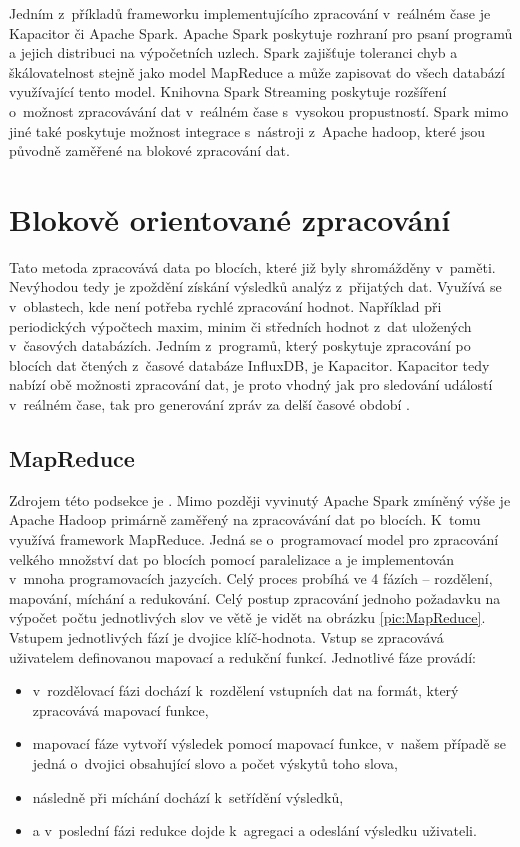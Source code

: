 Jedním z~příkladů frameworku implementujícího zpracování v~reálném čase je Kapacitor či Apache Spark. Apache Spark poskytuje rozhraní pro psaní programů a jejich distribuci na výpočetních uzlech. Spark zajišťuje toleranci chyb a škálovatelnost stejně jako model MapReduce a může zapisovat do všech databází využívající tento model. Knihovna Spark Streaming poskytuje rozšíření o~možnost zpracovávání dat v~reálném čase s~vysokou propustností. Spark mimo jiné také poskytuje možnost integrace s~nástroji z~Apache hadoop, které jsou původně zaměřené na blokové zpracování dat. 

\section{Blokově orientované zpracování}
Tato metoda zpracovává data po blocích, které již byly shromážděny v~paměti. Nevýhodou tedy je zpoždění získání výsledků analýz z~přijatých dat. Využívá se v~oblastech, kde není potřeba rychlé zpracování hodnot. Například při periodických výpočtech maxim, minim či středních hodnot z~dat uložených v~časových databázích. Jedním z~programů, který poskytuje zpracování po blocích dat čtených z~časové databáze InfluxDB, je Kapacitor. Kapacitor tedy nabízí obě možnosti zpracování dat, je proto vhodný jak pro sledování událostí v~reálném čase, tak pro generování zpráv za delší časové období \cite{batchProcessing}.

\subsection*{MapReduce}
Zdrojem této podsekce je \cite{MapReduce}. Mimo později vyvinutý Apache Spark zmíněný výše je Apache Hadoop primárně zaměřený na zpracovávání dat po blocích. K~tomu využívá framework MapReduce. Jedná se o~programovací model pro zpracování velkého množství dat po blocích pomocí paralelizace a je implementován v~mnoha programovacích jazycích. Celý proces probíhá ve 4 fázích -- rozdělení, mapování, míchání a redukování. Celý postup zpracování jednoho požadavku na výpočet počtu jednotlivých slov ve větě je vidět na obrázku \ref{pic:MapReduce}. Vstupem jednotlivých fází je dvojice klíč-hodnota. Vstup se zpracovává uživatelem definovanou mapovací a redukční funkcí. Jednotlivé fáze provádí:
\begin{itemize}
    \item v~rozdělovací fázi dochází k~rozdělení vstupních dat na formát, který zpracovává mapovací funkce,
    \item mapovací fáze vytvoří výsledek pomocí mapovací funkce, v~našem případě se jedná o~dvojici obsahující slovo a počet výskytů toho slova,
    \item následně při míchání dochází k~setřídění výsledků,
    \item a v~poslední fázi redukce dojde k~agregaci a odeslání výsledku uživateli.
\end{itemize}

